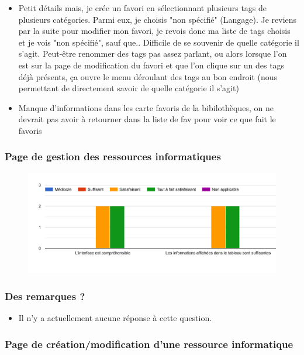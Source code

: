 \begin{itemize}
    \item Petit détails mais, je crée un favori en sélectionnant plusieurs tags de plusieurs catégories. Parmi eux, je choisis "non spécifié" (Langage). Je reviens par la suite pour modifier mon favori, je revois donc ma liste de tags choisis et je vois "non spécifié", sauf que.. Difficile de se souvenir de quelle catégorie il s'agit. Peut-être renommer des tags pas assez parlant, ou alors lorsque l'on est sur la page de modification du favori et que l'on clique sur un des tags déjà présents, ça ouvre le menu déroulant des tags au bon endroit (nous permettant de directement savoir de quelle catégorie il s'agit)
    \item Manque d'informations dans les carte favoris de la bibilothèques, on ne devrait pas avoir à retourner dans la liste de fav pour voir ce que fait le favoris
\end{itemize}


\subsubsection*{Page de gestion des ressources informatiques}

\begin{figure}[H]
    \includegraphics[width=\textwidth,height=0.3\textheight,keepaspectratio]{images/googleForm/gestionResInfo_1.png}
    \centering
\end{figure}

\subsubsection*{Des remarques ?}

\begin{itemize}
    \item Il n'y a actuellement aucune réponse à cette question.
\end{itemize}

\subsubsection*{Page de création/modification d'une ressource informatique}

